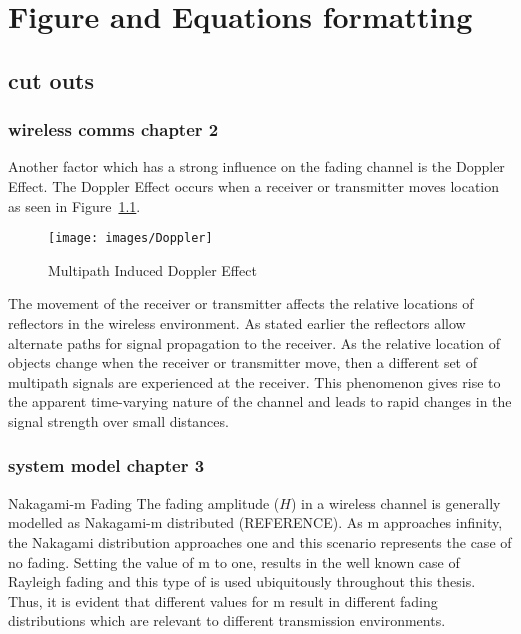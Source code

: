 \chapter{Figure and Equations formatting}
\vspace{-1.4em}

\section{cut outs}

\subsection{wireless comms chapter 2}
Another factor which has a strong influence on the fading channel is the Doppler Effect. The Doppler Effect 
occurs when a receiver or transmitter moves location as seen in Figure~\ref{fig:Doppler}. 
\begin{figure}[ht]
 \begin{center}
 \texttt{[image: images/Doppler]}
 \end{center} 
 \vspace{-1cm}
 \caption{Multipath Induced Doppler Effect~\cite{Goldsmith_2005}}
 \label{fig:Doppler}
\end{figure}
The movement of the receiver or transmitter affects the relative locations of reflectors in the wireless 
environment. As stated earlier the reflectors allow alternate paths for signal propagation to the receiver. 
As the relative location of objects change when the receiver or transmitter move, then a different set of 
multipath signals are experienced at the receiver. This phenomenon gives rise to the apparent time-varying 
nature of the channel and leads to rapid changes in the signal strength over small distances.

\subsection{system model chapter 3}
Nakagami-m Fading
The fading amplitude ($H$) in a wireless channel is generally modelled as Nakagami-m distributed (REFERENCE). As m approaches infinity, the Nakagami distribution approaches one and this scenario represents the case of no fading. Setting the value of m to one, results in the well known case of Rayleigh fading and this type of is used ubiquitously throughout this thesis. Thus, it is evident that different values for m result in different fading distributions which are relevant to different transmission environments.





